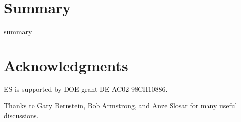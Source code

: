 \documentclass[12pt,preprint]{aastex}
\begin{document}
\section{Summary} \label{sec:summary}

summary

\section*{Acknowledgments}

ES is supported by DOE grant DE-AC02-98CH10886.

Thanks to Gary Bernstein, Bob Armstrong, and Anze Slosar for many useful
discussions.



\end{document}
